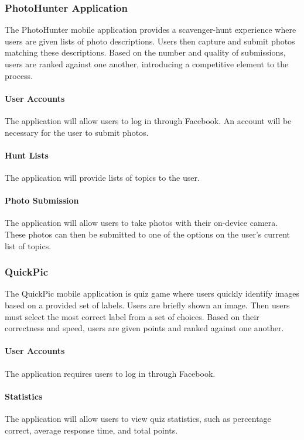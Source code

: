 \documentclass{article}
\begin{document}
\subsubsection{PhotoHunter Application}
The PhotoHunter mobile application provides a scavenger-hunt experience where
users are given lists of photo descriptions. Users then capture and submit
photos matching these descriptions. Based on the number and quality of
submissions, users are ranked against one another, introducing a competitive
element to the process.

  \paragraph{User Accounts}
  The application will allow users to log in through Facebook. An account will
  be necessary for the user to submit photos.

  \paragraph{Hunt Lists}
  The application will provide lists of topics to the user.

  \paragraph{Photo Submission}
  The application will allow users to take photos with their on-device camera.
  These photos can then be submitted to one of the options on the user's current
  list of topics.

\subsubsection{QuickPic}
The QuickPic mobile application is quiz game where users quickly identify
images based on a provided set of labels. Users are briefly shown an image.
Then users must select the most correct label from a set of choices. Based on
their correctness and speed, users are given points and ranked against one
another.

  \paragraph{User Accounts}
  The application requires users to log in through Facebook.

  \paragraph{Statistics}
  The application will allow users to view quiz statistics, such as percentage
  correct, average response time, and total points.
\end{document}
